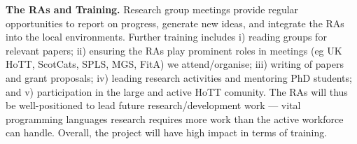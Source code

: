 \documentclass[a4paper,11pt]{article}
\begin{document}
{\bf The RAs and Training.} Research group meetings provide regular opportunities to report on
progress, generate new ideas, and integrate the
RAs into the local environments. Further training includes i)
reading groups for relevant papers; ii) ensuring the RAs play
prominent roles in meetings (eg UK HoTT, ScotCats, SPLS, MGS, FitA) we
attend/organise; iii) writing of papers and grant proposals; iv)
leading research activities and mentoring PhD students; and v)
participation in the large and active HoTT comunity. The RAs
will thus be well-positioned to lead future research/development work --- vital 
programming languages research requires more work than the active workforce can
handle. Overall, the project will have high impact in terms
of training.







\begin{footnotesize}
\begin{multicols}{2}

%
%

\end{multicols}
\end{footnotesize}

% 
% 
\end{document}
